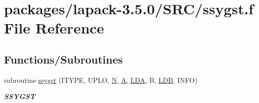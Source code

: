 \hypertarget{ssygst_8f}{}\section{packages/lapack-\/3.5.0/\+S\+R\+C/ssygst.f File Reference}
\label{ssygst_8f}
\subsection*{Functions/\+Subroutines}
\begin{DoxyCompactItemize}
\item 
subroutine \hyperlink{group__realSYcomputational_gaef1e992af47469e70d21e80c16d67d1b}{ssygst} (I\+T\+Y\+P\+E, U\+P\+L\+O, \hyperlink{polmisc_8c_a0240ac851181b84ac374872dc5434ee4}{N}, \hyperlink{classA}{A}, \hyperlink{example__user_8c_ae946da542ce0db94dced19b2ecefd1aa}{L\+D\+A}, B, \hyperlink{example__user_8c_a50e90a7104df172b5a89a06c47fcca04}{L\+D\+B}, I\+N\+F\+O)
\begin{DoxyCompactList}\small\item\em {\bfseries S\+S\+Y\+G\+S\+T} \end{DoxyCompactList}\end{DoxyCompactItemize}
